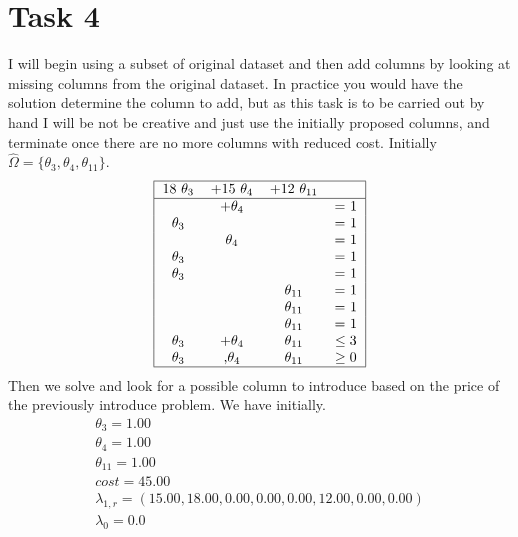 \documentclass{article}
\begin{document}
    \section{Task 4}
    I will begin using a subset of original dataset and then add columns by looking at missing columns from the original dataset.
    In practice you would have the solution determine the column to add, but as this task is to be carried out by hand I will be not be creative and just use the initially proposed columns, and terminate once there are no more columns with reduced cost.
    Initially $\hat{\Omega} = \{ \theta_3, \theta_4, \theta_{11} \}$.
    \[
        \begin{tabular}{ |c c c c | }
            \hline
            18 $\theta_3$ & +15 $\theta_4$ & +12 $\theta_{11}$ &\\
            \hline
            & +$\theta_4$ &          &  = 1 \\
            $\theta_3$ &  &                      &  = 1 \\
                        & $\theta_4$ &           &  = 1 \\
            $\theta_3$ &  &                      &  = 1 \\
            $\theta_3$ &  &                     &  = 1 \\
              &  &      $\theta_{11}$    &  = 1 \\
              &  &      $\theta_{11}$    &  = 1 \\
              &  &      $\theta_{11}$    &  = 1 \\
           $\theta_3$ & +$\theta_4$ & $\theta_{11}$ & $\leq 3$ \\
           $\theta_3$ & ,$\theta_4$ & $\theta_{11}$ & $\geq 0$ \\
            \hline
        \end{tabular}
    \]
    Then we solve and look for a possible column to introduce based on the price of the previously introduce problem.
    We have initially.
    \begin{equation*}
        \begin{array}{c}
            \theta_{3} = 1.00\\
            \theta_{4} = 1.00\\
            \theta_{11} = 1.00\\
            cost = 45.00\\
            \lambda_{1,r} = (15.00,18.00,0.00,0.00,0.00,12.00,0.00,0.00)\\
            \lambda_0 = 0.0
        \end{array}
    \end{equation*}
\end{document}
